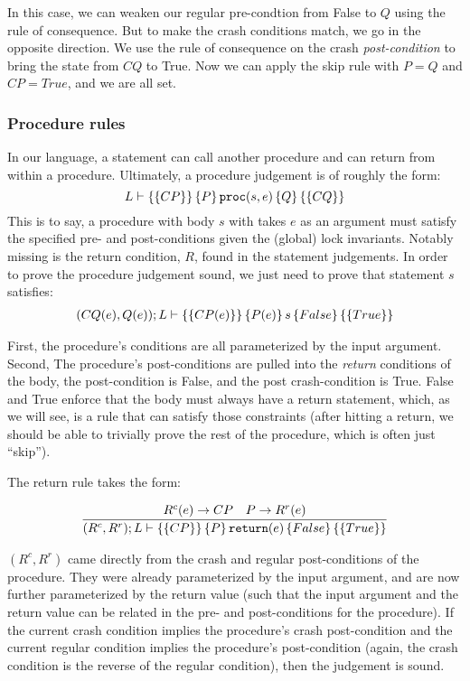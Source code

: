 In this case, we can weaken our regular pre-condtion from False to $Q$
using the rule of consequence. But to make the crash conditions match, we go in
the opposite direction. We use the rule of consequence on the crash
\textit{post-condition} to bring the state from $CQ$ to True. Now we can apply
the skip rule with $P=Q$ and $CP=True$, and we are all set.

\subsubsection{Procedure rules}

In our language, a statement can call another procedure and can return from
within a procedure. Ultimately, a procedure judgement is of roughly the form:
$$L \vdash \left\{\left\{ CP \right\}\right\} \left\{ P \right\} \texttt{proc}(s, e) \left\{ Q \right\} \left\{\left\{ CQ \right\}\right\}$$
This is to say, a procedure with body $s$ with takes $e$ as an argument must
satisfy the specified pre- and post-conditions given the (global) lock
invariants. Notably missing is the return condition, $R$, found in the statement
judgements. In order to prove the procedure judgement sound, we just need to
prove that statement $s$ satisfies:
\begin{gather*}
(CQ(e),Q(e)); L \vdash \left\{\left\{ CP(e) \right\}\right\} \left\{ P(e) \right\} s \left\{ False \right\} \left\{\left\{ True \right\}\right\}
\end{gather*}

First, the procedure's conditions are all parameterized by the input argument.
Second, The procedure's post-conditions are pulled into the \textit{return}
conditions of the body, the post-condition is False, and the post
crash-condition is True. False and True enforce that the body must always have a
return statement, which, as we will see, is a rule that can satisfy those
constraints (after hitting a return, we should be able to trivially prove the
rest of the procedure, which is often just ``skip'').

The return rule takes the form:

\begin{gather*}
    \infer{\hoarestmt{(R^c,R^r)}{L}{CP}{P}{\texttt{return}(e)}{False}{True}}
	  {R^c(e) \imp CP & P \imp R^r(e)}
\end{gather*}

$(R^c,R^r)$ came directly from the crash and regular post-conditions of the
procedure. They were already parameterized by the input argument, and are now
further parameterized by the return value (such that the input argument and the
return value can be related in the pre- and post-conditions for the procedure).
If the current crash condition implies the procedure's crash post-condition and
the current regular condition implies the procedure's post-condition (again, the
crash condition is the reverse of the regular condition), then the judgement is
sound.

